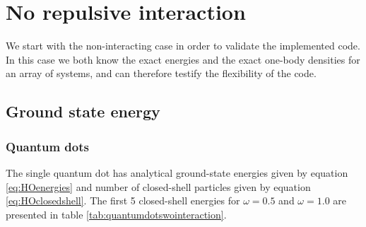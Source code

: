 \section{No repulsive interaction}
We start with the non-interacting case in order to validate the implemented code. In this case we both know the exact energies and the exact one-body densities for an array of systems, and can therefore testify the flexibility of the code. 

\subsection{Ground state energy}
\subsubsection{Quantum dots}
The single quantum dot has analytical ground-state energies given by equation \eqref{eq:HOenergies} and number of closed-shell particles given by equation \eqref{eq:HOclosedshell}. The first 5 closed-shell energies for $\omega=0.5$ and $\omega=1.0$ are presented in table \eqref{tab:quantumdotswointeraction}.

